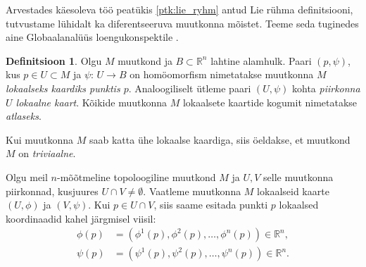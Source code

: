\documentclass[12pt,a4paper,oneside]{article}
\theoremstyle{plain}
\theoremstyle{definition}
\newtheorem{definitsioon}{Definitsioon}[section]
\numberwithin{equation}{section}
\def\R{{\mathbb R}}
\begin{document}
Arvestades käesoleva töö peatükis \ref{ptk:lie_ryhm} antud Lie 
rühma definitsiooni, tutvustame lühidalt ka diferentseeruva muutkonna 
mõistet. Teeme seda tuginedes aine Globaalanalüüs loengukonspektile 
\cite{globanal}.

\begin{definitsioon}
Olgu $M$ muutkond ja $B \subset \R^n$ lahtine alamhulk. Paari 
$\left(p, \psi\right)$, kus $p \in U \subset M$ ja 
$\psi \colon\, U \rightarrow B$ on homöomorfism nimetatakse muutkonna 
$M$ \emph{lokaalseks kaardiks punktis $p$}. Analoogiliselt ütleme 
paari $\left(U, \psi\right)$ kohta \emph{piirkonna $U$ lokaalne 
kaart}. Kõikide muutkonna $M$ lokaalsete kaartide kogumit nimetatakse 
\emph{atlaseks}.

Kui muutkonna $M$ saab katta ühe lokaalse kaardiga, siis öeldakse, 
et muutkond $M$ on \emph{triviaalne}.
\end{definitsioon}

Olgu meil $n$-mõõtmeline topoloogiline muutkond $M$ ja $U,V$ selle 
muutkonna piirkonnad, kusjuures $U \cap V \neq \emptyset$. Vaatleme 
muutkonna $M$ lokaalseid kaarte $\left(U, \phi\right)$ ja 
$\left(V, \psi\right)$. Kui $p \in U \cap V$, siis saame esitada 
punkti $p$ lokaalsed koordinaadid kahel järgmisel viisil:
\begin{align*}
\phi\left(p\right) &= \left(\phi^1\left(p\right), 
\phi^2\left(p\right), \ldots, \phi^n\left(p\right)\right) \in \R^n, \\
\psi\left(p\right) &= \left(\psi^1\left(p\right), 
\psi^2\left(p\right), \ldots, \psi^n\left(p\right)\right) \in \R^n.
\end{align*}
\end{document}
